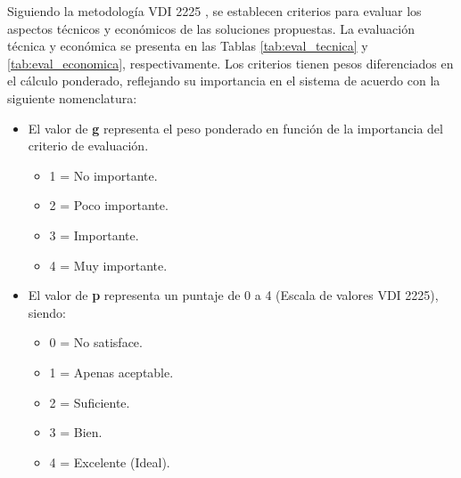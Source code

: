 Siguiendo la metodología VDI 2225 \cite{VDI2225_series}, se establecen criterios para evaluar los aspectos técnicos y económicos de las soluciones propuestas. La evaluación técnica y económica se presenta en las Tablas \ref{tab:eval_tecnica} y \ref{tab:eval_economica}, respectivamente. Los criterios tienen pesos diferenciados en el cálculo ponderado, reflejando su importancia en el sistema de acuerdo con la siguiente nomenclatura:

\begin{itemize}
\setlength\itemsep{0em}
	\item El valor de \textbf{g} representa el peso ponderado en función de la importancia del criterio de evaluación.
	\begin{itemize}
	\setlength\itemsep{0em}
		\item 1 = No importante.
		\item 2 = Poco importante.
		\item 3 = Importante.
		\item 4 = Muy importante.
	\end{itemize}
	\item El valor de \textbf{p} representa un puntaje de 0 a 4 (Escala de valores VDI 2225), siendo:
	\begin{itemize}
	\setlength\itemsep{0em}
		\item 0 = No satisface.
		\item 1 = Apenas aceptable.
		\item 2 = Suficiente.
		\item 3 = Bien.
		\item 4 = Excelente (Ideal).
	\end{itemize}
\end{itemize}
	

